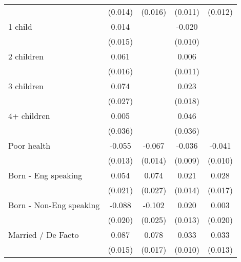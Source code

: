{\begin{tabular}{l*{4}{c}}
                    &     (0.014)         &     (0.016)         &     (0.011)         &     (0.012)         \\
[1em]
1 child             &       0.014         &                     &      -0.020\sym{*}  &                     \\
                    &     (0.015)         &                     &     (0.010)         &                     \\
[1em]
2 children          &       0.061\sym{***}&                     &       0.006         &                     \\
                    &     (0.016)         &                     &     (0.011)         &                     \\
[1em]
3 children          &       0.074\sym{**} &                     &       0.023         &                     \\
                    &     (0.027)         &                     &     (0.018)         &                     \\
[1em]
4+ children         &       0.005         &                     &       0.046         &                     \\
                    &     (0.036)         &                     &     (0.036)         &                     \\
[1em]
Poor health         &      -0.055\sym{***}&      -0.067\sym{***}&      -0.036\sym{***}&      -0.041\sym{***}\\
                    &     (0.013)         &     (0.014)         &     (0.009)         &     (0.010)         \\
[1em]
Born - Eng speaking &       0.054\sym{**} &       0.074\sym{**} &       0.021         &       0.028         \\
                    &     (0.021)         &     (0.027)         &     (0.014)         &     (0.017)         \\
[1em]
Born - Non-Eng speaking&      -0.088\sym{***}&      -0.102\sym{***}&       0.020         &       0.003         \\
                    &     (0.020)         &     (0.025)         &     (0.013)         &     (0.020)         \\
[1em]
Married / De Facto  &       0.087\sym{***}&       0.078\sym{***}&       0.033\sym{**} &       0.033\sym{*}  \\
                    &     (0.015)         &     (0.017)         &     (0.010)         &     (0.013)         \\

\end{tabular}}
